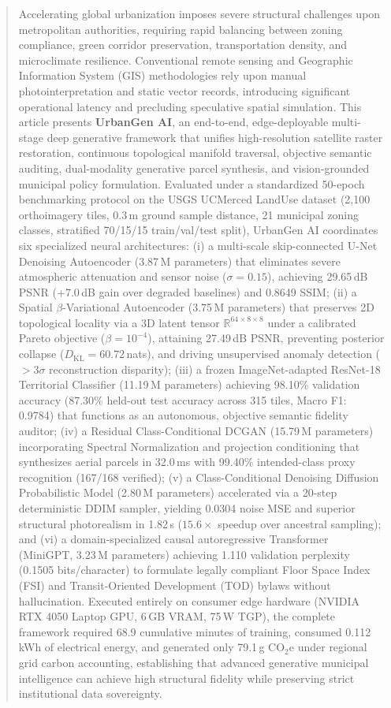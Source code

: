 \documentclass[journal]{IEEEtran}
\begin{document}
\begin{abstract}
Accelerating global urbanization imposes severe structural challenges upon metropolitan authorities, requiring rapid balancing between zoning compliance, green corridor preservation, transportation density, and microclimate resilience. Conventional remote sensing and Geographic Information System (GIS) methodologies rely upon manual photointerpretation and static vector records, introducing significant operational latency and precluding speculative spatial simulation. This article presents \textbf{UrbanGen AI}, an end-to-end, edge-deployable multi-stage deep generative framework that unifies high-resolution satellite raster restoration, continuous topological manifold traversal, objective semantic auditing, dual-modality generative parcel synthesis, and vision-grounded municipal policy formulation. Evaluated under a standardized 50-epoch benchmarking protocol on the USGS UCMerced LandUse dataset (2,100 orthoimagery tiles, 0.3\,m ground sample distance, 21 municipal zoning classes, stratified 70/15/15 train/val/test split), UrbanGen AI coordinates six specialized neural architectures: (i) a multi-scale skip-connected U-Net Denoising Autoencoder (3.87\,M parameters) that eliminates severe atmospheric attenuation and sensor noise ($\sigma = 0.15$), achieving 29.65\,dB PSNR (+7.0\,dB gain over degraded baselines) and 0.8649 SSIM; (ii) a Spatial $\beta$-Variational Autoencoder (3.75\,M parameters) that preserves 2D topological locality via a 3D latent tensor $\mathbb{R}^{64 \times 8 \times 8}$ under a calibrated Pareto objective ($\beta = 10^{-4}$), attaining 27.49\,dB PSNR, preventing posterior collapse ($D_{\text{KL}} = 60.72$\,nats), and driving unsupervised anomaly detection ($>3\sigma$ reconstruction disparity); (iii) a frozen ImageNet-adapted ResNet-18 Territorial Classifier (11.19\,M parameters) achieving 98.10\% validation accuracy (87.30\% held-out test accuracy across 315 tiles, Macro F1: 0.9784) that functions as an autonomous, objective semantic fidelity auditor; (iv) a Residual Class-Conditional DCGAN (15.79\,M parameters) incorporating Spectral Normalization and projection conditioning that synthesizes aerial parcels in 32.0\,ms with 99.40\% intended-class proxy recognition (167/168 verified); (v) a Class-Conditional Denoising Diffusion Probabilistic Model (2.80\,M parameters) accelerated via a 20-step deterministic DDIM sampler, yielding 0.0304 noise MSE and superior structural photorealism in 1.82\,s ($15.6\times$ speedup over ancestral sampling); and (vi) a domain-specialized causal autoregressive Transformer (MiniGPT, 3.23\,M parameters) achieving 1.110 validation perplexity (0.1505 bits/character) to formulate legally compliant Floor Space Index (FSI) and Transit-Oriented Development (TOD) bylaws without hallucination. Executed entirely on consumer edge hardware (NVIDIA RTX 4050 Laptop GPU, 6\,GB VRAM, 75\,W TGP), the complete framework required 68.9 cumulative minutes of training, consumed 0.112\,kWh of electrical energy, and generated only 79.1\,g CO$_2$e under regional grid carbon accounting, establishing that advanced generative municipal intelligence can achieve high structural fidelity while preserving strict institutional data sovereignty.
\end{abstract}
\end{document}
